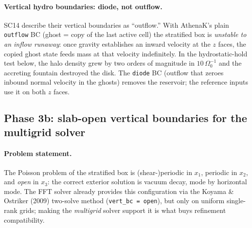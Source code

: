 \documentclass[11pt]{article}
\newcommand{\code}[1]{\texttt{#1}}
\newcommand{\Om}{\Omega_0}
\begin{document}
\paragraph{Vertical hydro boundaries: diode, not outflow.} SC14 describe their
vertical boundaries as ``outflow.'' With AthenaK's plain \code{outflow} BC (ghost =
copy of the last active cell) the stratified box is \emph{unstable to an inflow
runaway}: once gravity establishes an inward velocity at the $z$ faces, the copied
ghost state feeds mass at that velocity indefinitely. In the hydrostatic-hold test
below, the halo density grew by two orders of magnitude in $10\,\Om^{-1}$ and the
accreting fountain destroyed the disk. The \code{diode} BC (outflow that zeroes
inbound normal velocity in the ghosts) removes the reservoir; the reference inputs
use it on both $z$ faces.

\subsection{Phase 3b: slab-open vertical boundaries for the multigrid solver}
\label{sec:phase3b}

\paragraph{Problem statement.} The Poisson problem of the stratified box is
(shear-)periodic in $x_1$, periodic in $x_2$, and \emph{open} in $x_3$: the correct
exterior solution is vacuum decay, mode by horizontal mode. The FFT solver already
provides this configuration via the Koyama \& Ostriker (2009) two-solve method
(\code{vert\_bc\,=\,open}), but only on uniform single-rank grids; making the
\emph{multigrid} solver support it is what buys refinement compatibility.
\end{document}
